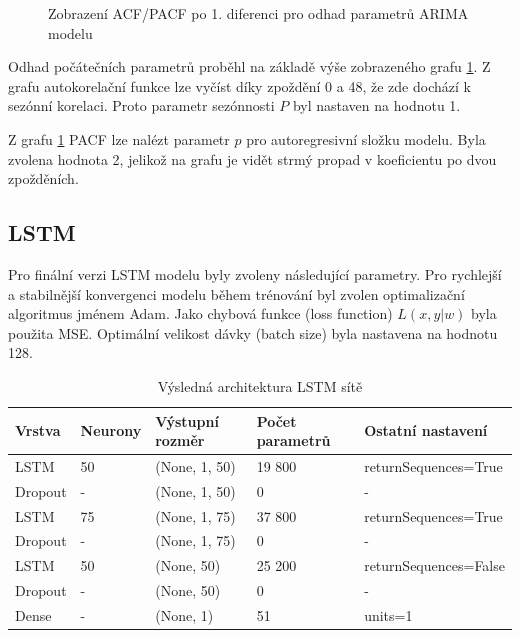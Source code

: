 \documentclass[FM,BP,fonts]{tulthesis}
\begin{document}
\begin{figure}[htbp]
 	\centering
 	\caption{Zobrazení ACF/PACF po 1. diferenci pro odhad parametrů ARIMA modelu}
 	\label{fig:arima_acf_pacf}
 \end{figure}
Odhad počátečních parametrů proběhl na základě výše zobrazeného grafu \ref{fig:arima_acf_pacf}. Z grafu autokorelační funkce lze vyčíst díky zpoždění 0 a 48, že zde dochází k sezónní korelaci. Proto parametr sezónnosti $P$ byl nastaven na hodnotu 1.

Z grafu \ref{fig:arima_acf_pacf} PACF lze nalézt parametr $p$ pro autoregresivní složku modelu. Byla zvolena hodnota 2, jelikož na grafu je vidět strmý propad v koeficientu po dvou zpožděních. 

 
 


\newpage
\subsection{LSTM}
Pro finální verzi LSTM modelu byly zvoleny následující parametry. Pro rychlejší a stabilnější konvergenci modelu během trénování byl zvolen optimalizační algoritmus jménem Adam. Jako chybová funkce (loss function) $L(x,y|w)$ byla použita MSE. 
Optimální velikost dávky (batch size) byla nastavena na hodnotu 128. 

\begin{table}[!ht]
	\centering
	\caption{Výsledná architektura LSTM sítě}
	
	\begin{tabularx}{\linewidth}{llXXX}
		\hline
		\textbf{Vrstva} & \textbf{Neurony} & \textbf{Výstupní rozměr} & \textbf{Počet parametrů} & \textbf{Ostatní nastavení} \\ \hline
		LSTM & 50 & (None, 1, 50) & 19 800 & returnSequences=True \\
		Dropout & - & (None, 1, 50) & 0 & - \\
		LSTM  & 75 & (None, 1, 75) & 37 800 & returnSequences=True \\
		Dropout & - & (None, 1, 75) & 0 & - \\
		LSTM   & 50 & (None, 50) & 25 200 & returnSequences=False \\
		Dropout & - & (None, 50) & 0 & - \\
		Dense & - & (None, 1) & 51 & units=1 \\
		
		
	\end{tabularx}
\end{table}
\end{document}
